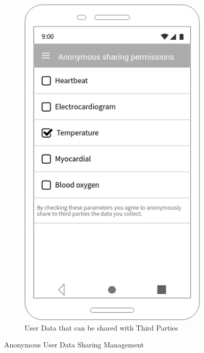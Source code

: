 \begin{figure}[h!]
\begin{subfigure}[b]{0.25\linewidth}
  \end{subfigure}
 ~ ~ ~ ~ ~ ~ 
  \begin{subfigure}[b]{0.25\linewidth}

    \includegraphics[width=\linewidth]{img/mockup/u_anonym.jpg}

    \caption{User Data that can be shared with Third Parties}

  \end{subfigure}

  \caption{Anonymous User Data Sharing Management}

 \end{figure}

